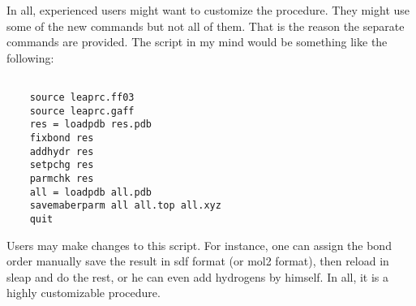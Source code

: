 \documentclass[letterpaper]{article}
\begin{document}
    In all, experienced users might want to customize the procedure. They might use some of the
new commands but not all of them. That is the reason the separate commands are provided. The script
in my mind would be something like the following:

\begin{lstlisting}

    source leaprc.ff03
    source leaprc.gaff
    res = loadpdb res.pdb
    fixbond res
    addhydr res
    setpchg res
    parmchk res
    all = loadpdb all.pdb
    savemaberparm all all.top all.xyz
    quit

\end{lstlisting}

   Users may make changes to this script. For instance, one can assign the bond order manually save
the result in sdf format (or mol2 format), then reload in sleap and do the rest, or he can even add
hydrogens by himself. In all, it is a highly customizable procedure.
\end{document}
